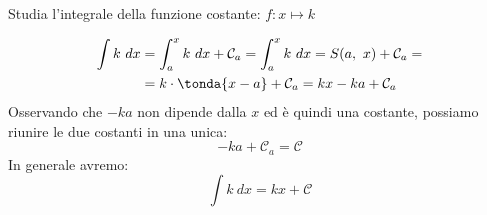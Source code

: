 \begin{esempio}
Studia l'integrale della funzione costante: \(f: x \mapsto k\)

\begin{minipage}{.59 \textwidth}
\begin{align*}
\int k~dx &= \int_a^x k~dx + \mathcal{C}_a =
             \int_a^x k~dx = S(a,~x) + \mathcal{C}_a = \\
          &= k \cdot \tonda{x -a} + \mathcal{C}_a = 
             kx - ka + \mathcal{C}_a
\end{align*}
Osservando che \(-ka\) non dipende dalla \(x\) ed è quindi una costante, 
possiamo riunire le due costanti in una unica:
\[-ka + \mathcal{C}_a = \mathcal{C}\]
In generale avremo: 
\[\int k~dx = kx + \mathcal{C}\]
\end{minipage}
\hfill
\begin{minipage}{.39 \textwidth}
\begin{inaccessibleblock}[] 
  \begin{center}  \end{center}
\end{inaccessibleblock}
\end{minipage}
\end{esempio}

